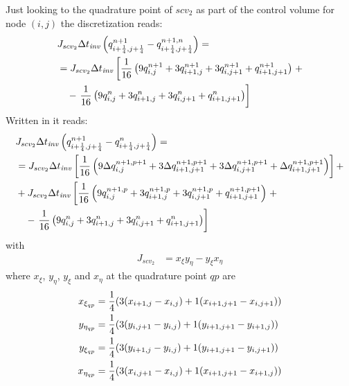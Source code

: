 Just looking to the quadrature point of $scv_2$ as part of the control volume for node $(i,j)$ the discretization reads:
\begin{align}
    &J_{scv_2}\Delta t_{\it{inv}} \left( q^{n+1}_{i+\frac{1}{4}, j+\frac{1}{4}} -  q^{n+1,n}_{i+\frac{1}{4}, j+\frac{1}{4}} \right) =
    \\*
    &= J_{scv_2}\Delta t_{\it{inv}} \left[ \frac{1}{16}\left( 9q^{n+1}_{i, j} + 3 q^{n+1}_{i+1,j}  + 3  q^{n+1}_{i, j+1} + q^{n+1}_{i+1, j+1}\right) \right. +
    \\*
    &\quad - \left. \frac{1}{16}\left( 9 q^{n}_{i, j} +  3 q^{n}_{i+1,j}  + 3  q^{n}_{i, j+1} + q^{n}_{i+1, j+1}\right)\right]
\end{align}
Written in \deltaformulation  it reads:
\begin{align}
    &J_{scv_2}\Delta t_{\it{inv}} \left( q^{n+1}_{i+\frac{1}{4}, j+\frac{1}{4}} -  q^{n}_{i+\frac{1}{4}, j+\frac{1}{4}} \right) =
    \nonumber \\*
    &=J_{scv_2}\Delta t_{\it{inv}} \left[ \frac{1}{16}\left( 9 \Delta q^{n+1,p+1}_{i, j} + 3 \Delta q^{n+1,p+1}_{i+1,j+1}  + 3 \Delta q^{n+1,p+1}_{i, j+1} + \Delta q^{n+1,p+1}_{i+1, j+1}\right) \right] +
    \nonumber \\*
    & + J_{scv_2}\Delta t_{\it{inv}} \left[ \frac{1}{16}\left( 9 q^{n+1,p}_{i, j} + 3 q^{n+1,p}_{i+1,j}  + 3 q^{n+1,p}_{i, j+1} + q^{n+1,p+1}_{i+1, j+1}\right) \right. +
    \nonumber \\*
    &\quad - \left. \frac{1}{16}\left( 9q^{n}_{i, j} +  3 q^{n}_{i+1,j}  + 3  q^{n}_{i, j+1} + q^{n}_{i+1, j+1}\right)\right]
\end{align}
with
\begin{align}
    J_{scv_2} &= x_\xi y_\eta - y_\xi x_\eta
\end{align}
where $x_\xi$, $y_\eta$, $y_\xi$ and $x_\eta$ at the quadrature point $qp$ are
\begin{align}
    x_{\xi_{qp}}  & = \frac{1}{4} ( 3 (x_{i+1,j} - x_{i,j}) + 1 (x_{i+1,j+1} - x_{i,j+1}) )
    \\
    y_{\eta_{qp}} & = \frac{1}{4} ( 3 (y_{i,j+1} - y_{i,j}) + 1 (y_{i+1,j+1} - y_{i+1,j}) )
    \\
    y_{\xi_{qp}}  & = \frac{1}{4} ( 3 (y_{i+1,j} - y_{i,j}) + 1 (y_{i+1,j+1} - y_{i,j+1}) )
    \\
    x_{\eta_{qp}} & = \frac{1}{4} ( 3 (x_{i,j+1} - x_{i,j}) + 1 (x_{i+1,j+1} - x_{i+1,j})  )
\end{align}

